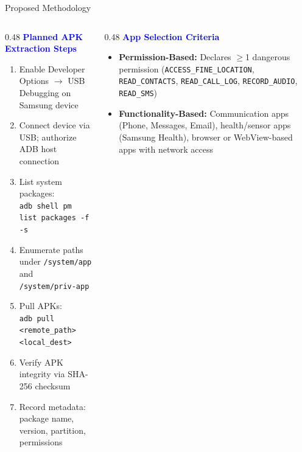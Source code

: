 \documentclass[aspectratio=169]{beamer}
\begin{document}
\begin{frame}{Proposed Methodology}
\begin{columns}[T]
    \begin{column}{0.48\textwidth}
        \textbf{\textcolor{blue}{Planned APK Extraction Steps}}
        \begin{enumerate}\small
            \item Enable Developer Options $\rightarrow$ USB Debugging on Samsung device
            \item Connect device via USB; authorize ADB host connection
            \item List system packages:\\
                  {\footnotesize\texttt{adb shell pm list packages -f -s}}
            \item Enumerate paths under \texttt{/system/app} and
                  \texttt{/system/priv-app}
            \item Pull APKs:\\
                  {\footnotesize\texttt{adb pull <remote\_path> <local\_dest>}}
            \item Verify APK integrity via SHA-256 checksum
            \item Record metadata: package name, version, partition,
                  permissions
        \end{enumerate}
    \end{column}

    \begin{column}{0.48\textwidth}
        \textbf{\textcolor{blue}{App Selection Criteria}}
        \begin{itemize}\small
            \item \textbf{Permission-Based:}
                  Declares $\geq$1 dangerous permission
                  (\texttt{ACCESS\_FINE\_LOCATION},
                  \texttt{READ\_CONTACTS},
                  \texttt{READ\_CALL\_LOG},
                  \texttt{RECORD\_AUDIO},
                  \texttt{READ\_SMS})

            \item \textbf{Functionality-Based:}
                  Communication apps (Phone, Messages, Email),
                  health/sensor apps (Samsung Health),
                  browser or WebView-based apps with network access


\end{itemize}
\end{column}
\end{columns}
\end{frame}
\end{document}
